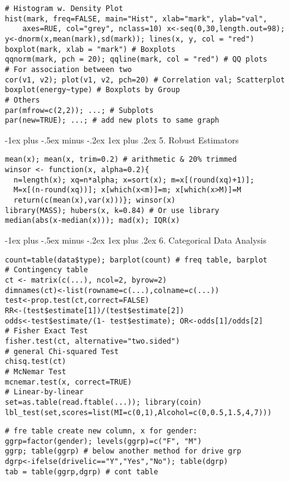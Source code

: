 \documentclass[10pt,landscape,letterpaper]{article}
\makeatletter
\renewcommand{\subsubsection}{\@startsection{subsubsection}{3}{0mm}%
                                {-1ex plus -.5ex minus -.2ex}%
                                {1ex plus .2ex}%
                                {\normalfont\small\itshape}}
\makeatother
\begin{document}
\begin{multicols}{3}
\begin{verbatim}
# Histogram w. Density Plot
hist(mark, freq=FALSE, main="Hist", xlab="mark", ylab="val", 
    axes=RUE, col="grey", nclass=10) x<-seq(0,30,length.out=98); 
y<-dnorm(x,mean(mark),sd(mark)); lines(x, y, col = "red")
boxplot(mark, xlab = "mark") # Boxplots
qqnorm(mark, pch = 20); qqline(mark, col = "red") # QQ plots
# For association between two
cor(v1, v2); plot(v1, v2, pch=20) # Correlation val; Scatterplot
boxplot(energy~type) # Boxplots by Group
# Others
par(mfrow=c(2,2)); ...; # Subplots
par(new=TRUE); ...; # add new plots to same graph
\end{verbatim}

\subsubsection{5. Robust Estimators}
\begin{verbatim}
mean(x); mean(x, trim=0.2) # arithmetic & 20% trimmed
winsor <- function(x, alpha=0.2){
  n=length(x); xq=n*alpha; x=sort(x); m=x[(round(xq)+1)]; 
  M=x[(n-round(xq))]; x[which(x<m)]=m; x[which(x>M)]=M
  return(c(mean(x),var(x)))}; winsor(x)
library(MASS); hubers(x, k=0.84) # Or use library
median(abs(x-median(x))); mad(x); IQR(x)
\end{verbatim}

\subsubsection{6. Categorical Data Analysis}
\begin{verbatim}
count=table(data$type); barplot(count) # freq table, barplot
# Contingency table
ct <- matrix(c(...), ncol=2, byrow=2)
dimnames(ct)<-list(rowname=c(...),colname=c(...))
test<-prop.test(ct,correct=FALSE)
RR<-(test$estimate[1])/(test$estimate[2])
odds<-test$estimate/(1- test$estimate); OR<-odds[1]/odds[2]
# Fisher Exact Test
fisher.test(ct, alternative="two.sided")
# general Chi-squared Test
chisq.test(ct)
# McNemar Test
mcnemar.test(x, correct=TRUE)
# Linear-by-linear
set=as.table(read.ftable(...)); library(coin)
lbl_test(set,scores=list(MI=c(0,1),Alcohol=c(0,0.5,1.5,4,7)))
\end{verbatim}

\begin{verbatim}
# fre table create new column, x for gender:
ggrp=factor(gender); levels(ggrp)=c("F", "M")
ggrp; table(ggrp) # below another method for drive grp
dgrp<-ifelse(drivelic=="Y","Yes","No"); table(dgrp)
tab = table(ggrp,dgrp) # cont table


\end{verbatim}
\end{multicols}
\end{document}
